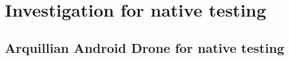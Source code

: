 \documentclass[12pt,final,oneside]{fithesis}
\begin{document}
\chapter{Investigation for native testing}

	\section{Arquillian Android Drone for native testing}


\printindex

%

\appendix
\end{document}
